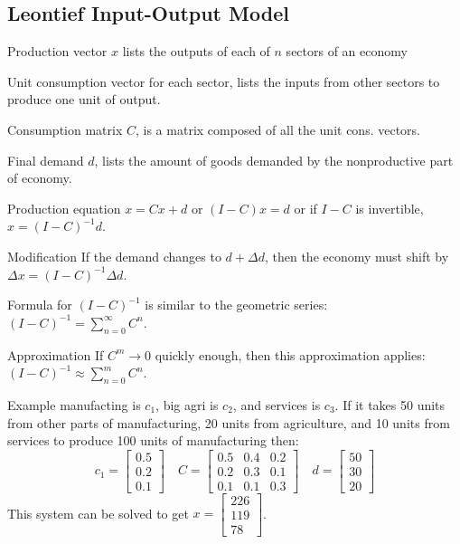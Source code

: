 \begin{card}
    \subsection{Leontief Input-Output Model}

    \begin{compactdesc}
    \item[Production vector] $x$ lists the outputs of each of $n$ sectors of
        an economy
    \item[Unit consumption vector] for each sector, lists the inputs from
        other sectors to produce one unit of output.
    \item[Consumption matrix] $C$, is a matrix composed of all the unit cons.
        vectors.
    \item[Final demand] $d$, lists the amount of goods demanded by the
        nonproductive part of economy.
    \item[Production equation] $x = Cx + d$ or $(I - C)x = d$ or if
        $I - C$ is invertible, $x = (I - C)^{-1}d$.
    \item[Modification] If the demand changes to $d + \Delta d$, then the
        economy must shift by $\Delta x = (I - C)^{-1}\Delta d$.
    \item[Formula for $(I - C)^{-1}$] is similar to the geometric series:
        $(I - C)^{-1} = \sum^\infty_{n=0} C^n$.
    \item[Approximation] If $C^m \to 0$ quickly enough, then this approximation
        applies: $(I - C)^{-1} \approx \sum^m_{n=0} C^n$.
    \item[Example] manufacting is $c_1$, big agri is $c_2$, and services is
        $c_3$. If it takes 50 units from other parts of manufacturing,
        20 units from agriculture, and 10 units from services to produce 100
        units of manufacturing then:
        \[
            c_1 = \begin{bmatrix} 0.5 \\ 0.2 \\ 0.1 \end{bmatrix}
            \quad
            C = \begin{bmatrix} 0.5 & 0.4 & 0.2 \\ 0.2 & 0.3 & 0.1 \\ 0.1 & 0.1 & 0.3 \end{bmatrix}
            \quad
            d = \begin{bmatrix} 50 \\ 30 \\ 20 \end{bmatrix}
        \]
        This system can be solved to get $x = \begin{bmatrix} 226 \\ 119 \\ 78 \end{bmatrix}$.
    \end{compactdesc}
\end{card}


